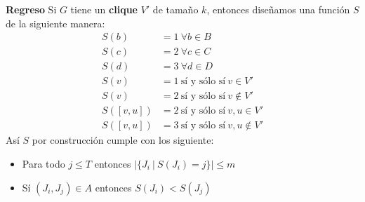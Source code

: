 \documentclass[spanish, xcolor=dvipsnames, aspectratio=169]{beamer}
\newcommand{\subsectiontitle}{}
\begin{document}
\begin{frame}{\subsectiontitle}
\textbf{Regreso}
\newline
Si \(G\) tiene un \textbf{clique} \(V'\) de tamaño \(k\), entonces diseñamos una función \(S\) de la siguiente manera:
\begin{align*}
    S\left(b\right) &= 1 \ \forall b \in B \\
    S\left(c\right) &= 2 \ \forall c \in C \\
    S\left(d\right) &= 3 \ \forall d \in D \\
    S\left(v\right) &= 1 \ \text{sí y sólo sí} \ v \in V' \\
    S\left(v\right) &= 2 \ \text{sí y sólo sí} \ v \notin V' \\
    S\left(\left[v, u\right]\right) &= 2 \ \text{sí y sólo sí} \ v, u \in V' \\
    S\left(\left[v, u\right]\right) &= 3 \ \text{sí y sólo sí} \ v, u \notin V'
\end{align*}
Así \(S\) por construcción cumple con los siguiente:
\begin{itemize}
    \item Para todo \(j \leq T \) entonces \(|\{J_{i} \ | \ S\left(J_{i}\right) = j\}| \leq m\)
    \item Sí \(\left(J_{i}, J_{j}\right) \in A\) entonces \(S\left(J_{i}\right) < S\left(J_{j}\right)\)
\end{itemize}
\end{frame}
\renewcommand{\subsectiontitle}{Ejemplificación de la transformación}
\end{document}

